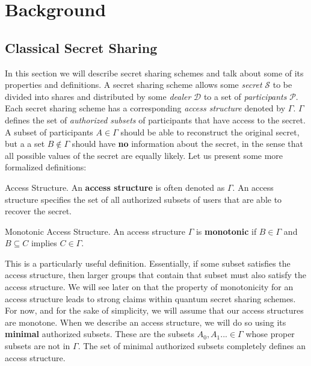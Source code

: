 \chapter{Background}

\section{Classical Secret Sharing}

In this section we will describe secret sharing schemes and talk about some of its properties and definitions. A secret sharing scheme allows some \textit{secret} $\mathcal{S}$ to be divided into shares and distributed by some \textit{dealer} $\mathcal{D}$ to a set of \textit{participants} $\mathcal{P}$. Each secret sharing scheme has a corresponding \textit{access structure} denoted by $\Gamma$. $\Gamma$ defines the set of \textit{authorized subsets} of participants that have access to the secret. A subset of participants $A \in \Gamma$ should be able to reconstruct the original secret, but a a set $B \notin \Gamma$ should have \textbf{no} information about the secret, in the sense that all possible values of the secret are equally likely. Let us present some more formalized definitions:

\theoremstyle{definition}
\begin{definition}{Access Structure.}
    An \textbf{access structure} is often denoted as $\Gamma$. An access structure specifies the set of all authorized subsets of users that are able to recover the secret.
\end{definition}

\theoremstyle{definition}
\begin{definition}{Monotonic Access Structure.}
    An access structure $\Gamma$ is \textbf{monotonic} if $B \in \Gamma$ and $B \subseteq C$ implies $C \in \Gamma$.
\end{definition}

This is a particularly useful definition. Essentially, if some subset satisfies the access structure, then larger groups that contain that subset must also satisfy the access structure. We will see later on that the property of monotonicity for an access structure leads to strong claims within quantum secret sharing schemes. For now, and for the sake of simplicity, we will assume that our access structures are monotone. When we describe an access structure, we will do so using its \textbf{minimal} authorized subsets. These are the subsets $A_0, A_1... \in \Gamma$ whose proper subsets are not in $\Gamma$. The set of minimal authorized subsets completely defines an access structure. 

